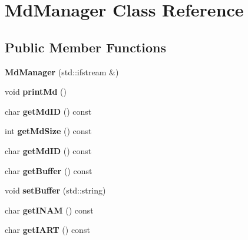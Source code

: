 \hypertarget{classMdManager}{}\section{Md\+Manager Class Reference}
\label{classMdManager}
\subsection*{Public Member Functions}
\begin{DoxyCompactItemize}
\item 
\mbox{\label{classMdManager_a9a04c96ea303f2e8d18275ba75af2551}} 
{\bfseries Md\+Manager} (std\+::ifstream \&)
\item 
\mbox{\label{classMdManager_af9a631c2934e89728ae34be82f78e7fe}} 
void {\bfseries print\+Md} ()
\item 
\mbox{\label{classMdManager_a73d0ce9c043f15e4669e9ace2b0a3412}} 
char {\bfseries get\+Md\+ID} () const
\item 
\mbox{\label{classMdManager_a6a66514fb65ab16e2f04ac61a67d155a}} 
int {\bfseries get\+Md\+Size} () const
\item 
\mbox{\label{classMdManager_a73d0ce9c043f15e4669e9ace2b0a3412}} 
char {\bfseries get\+Md\+ID} () const
\item 
\mbox{\label{classMdManager_aebdcaf71b956ae679f42e20d687078f3}} 
char {\bfseries get\+Buffer} () const
\item 
\mbox{\label{classMdManager_ade57e3eae97eb7116577e4b4ffff9a20}} 
void {\bfseries set\+Buffer} (std\+::string)
\item 
\mbox{\label{classMdManager_a3393408489236bfce3924442750c6024}} 
char {\bfseries get\+I\+N\+AM} () const
\item 
\mbox{\label{classMdManager_a30b66aad63d922fb9aafa05044834865}} 
char {\bfseries get\+I\+A\+RT} () const
\item 
\mbox{\label{classMdManager_ae0ccd5fe0f143b5d9652d75498cd2464}} 

\end{DoxyCompactItemize}
